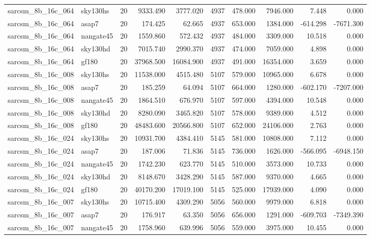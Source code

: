 \documentclass{article}
\begin{document}
\begin{longtable}{llrrrrrrrr}
sarcsm\_8b\_16c\_064 & sky130hs & 20 & 9333.490 & 3777.020 & 4937 & 478.000 & 7946.000 & 7.448 & 0.000 \\
sarcsm\_8b\_16c\_064 & asap7 & 20 & 174.425 & 62.665 & 4937 & 653.000 & 1384.000 & -614.298 & -7671.300 \\
sarcsm\_8b\_16c\_064 & nangate45 & 20 & 1559.860 & 572.432 & 4937 & 484.000 & 3309.000 & 10.518 & 0.000 \\
sarcsm\_8b\_16c\_064 & sky130hd & 20 & 7015.740 & 2990.370 & 4937 & 474.000 & 7059.000 & 4.898 & 0.000 \\
sarcsm\_8b\_16c\_064 & gf180 & 20 & 37968.500 & 16084.900 & 4937 & 491.000 & 16354.000 & 3.659 & 0.000 \\
sarcsm\_8b\_16c\_008 & sky130hs & 20 & 11538.000 & 4515.480 & 5107 & 579.000 & 10965.000 & 6.678 & 0.000 \\
sarcsm\_8b\_16c\_008 & asap7 & 20 & 185.259 & 64.094 & 5107 & 664.000 & 1280.000 & -602.170 & -7207.000 \\
sarcsm\_8b\_16c\_008 & nangate45 & 20 & 1864.510 & 676.970 & 5107 & 597.000 & 4394.000 & 10.548 & 0.000 \\
sarcsm\_8b\_16c\_008 & sky130hd & 20 & 8280.090 & 3465.820 & 5107 & 578.000 & 9389.000 & 4.512 & 0.000 \\
sarcsm\_8b\_16c\_008 & gf180 & 20 & 48483.600 & 20566.800 & 5107 & 652.000 & 24106.000 & 2.763 & 0.000 \\
sarcsm\_8b\_16c\_024 & sky130hs & 20 & 10931.700 & 4384.410 & 5145 & 581.000 & 10808.000 & 7.112 & 0.000 \\
sarcsm\_8b\_16c\_024 & asap7 & 20 & 187.006 & 71.836 & 5145 & 736.000 & 1626.000 & -566.095 & -6948.150 \\
sarcsm\_8b\_16c\_024 & nangate45 & 20 & 1742.230 & 623.770 & 5145 & 510.000 & 3573.000 & 10.733 & 0.000 \\
sarcsm\_8b\_16c\_024 & sky130hd & 20 & 8148.670 & 3428.290 & 5145 & 587.000 & 9370.000 & 4.665 & 0.000 \\
sarcsm\_8b\_16c\_024 & gf180 & 20 & 40170.200 & 17019.100 & 5145 & 525.000 & 17939.000 & 4.090 & 0.000 \\
sarcsm\_8b\_16c\_007 & sky130hs & 20 & 10715.400 & 4309.290 & 5056 & 560.000 & 9979.000 & 6.818 & 0.000 \\
sarcsm\_8b\_16c\_007 & asap7 & 20 & 176.917 & 63.350 & 5056 & 656.000 & 1291.000 & -609.703 & -7349.390 \\
sarcsm\_8b\_16c\_007 & nangate45 & 20 & 1758.960 & 639.996 & 5056 & 559.000 & 3975.000 & 10.455 & 0.000 \\

\end{longtable}
\end{document}
